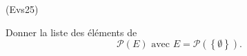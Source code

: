 \begin{tiny}(Evs25)\end{tiny} Donner la liste des éléments de
\begin{displaymath}
  \mathcal{P}(E) \text{ avec } E = \mathcal{P}(\left\lbrace \emptyset\right\rbrace ).
\end{displaymath}
